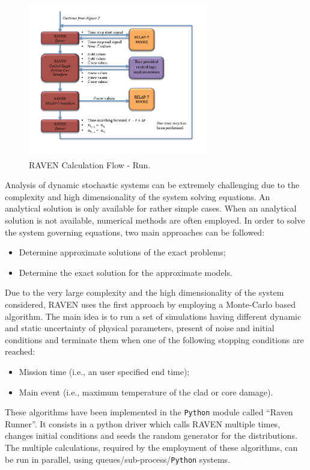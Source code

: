 \documentclass{mc2013}
\begin{document}
\begin{figure} 
  \centering
     \includegraphics[width=0.7\textwidth]{figures/CalculationFlow_part_2.PNG}
  \caption{RAVEN Calculation Flow - Run.}
  \label{fig:CalcFlow2}
\end{figure}
\label{sec:pyhtonCalcDriver}
Analysis of dynamic stochastic systems can be extremely challenging due to the complexity and high dimensionality of the system solving equations. An analytical solution is only available for rather simple cases. When an analytical solution is not available, numerical methods are often employed. In order to solve the system governing equations, two main approaches can be followed:
\begin{itemize}
\item Determine approximate solutions of the exact problems;
\item Determine the exact solution for the approximate models.
\end{itemize}
Due to the very large complexity and the high dimensionality of the system considered, RAVEN uses the first approach by employing a Monte-Carlo based algorithm. 
The main idea is to run a set of simulations having different dynamic and static uncertainty of physical parameters, present of noise and initial conditions and terminate them when one of the following stopping conditions are reached:
\begin{itemize}
\item Mission time (i.e., an user specified end time);
\item Main event (i.e., maximum temperature of the clad or core damage).
\end{itemize}
These algorithms have been implemented in the \verb!Python! module called ``Raven Runner''. It consists in a python driver which calls RAVEN multiple times, changes initial conditions and seeds the random generator for the distributions.
The multiple calculations, required by the employment of these algorithms, can be run in parallel, using queues/sub-process/\verb!Python! systems.  
\end{document}
